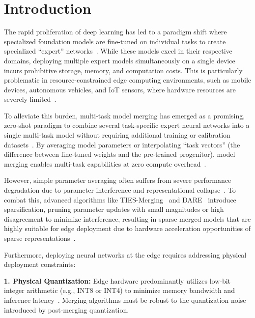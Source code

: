 \documentclass{article}
\theoremstyle{plain}
\theoremstyle{definition}
\theoremstyle{remark}
\begin{document}
\section{Introduction}
\label{sec:intro}

The rapid proliferation of deep learning has led to a paradigm shift where specialized foundation models are fine-tuned on individual tasks to create specialized ``expert'' networks~\cite{touvron23llama, devlin18bert}. While these models excel in their respective domains, deploying multiple expert models simultaneously on a single device incurs prohibitive storage, memory, and computation costs. This is particularly problematic in resource-constrained edge computing environments, such as mobile devices, autonomous vehicles, and IoT sensors, where hardware resources are severely limited~\cite{gholami21quantization}.

To alleviate this burden, multi-task model merging has emerged as a promising, zero-shot paradigm to combine several task-specific expert neural networks into a single multi-task model without requiring additional training or calibration datasets~\cite{fedavg, wortsman22wa, choshen23fusing}. By averaging model parameters or interpolating ``task vectors'' (the difference between fine-tuned weights and the pre-trained progenitor), model merging enables multi-task capabilities at zero compute overhead~\cite{ilharco22task}. 

However, simple parameter averaging often suffers from severe performance degradation due to parameter interference and representational collapse~\cite{ortiz23parameter}. To combat this, advanced algorithms like TIES-Merging~\cite{yadav23ties} and DARE~\cite{yu23dare} introduce sparsification, pruning parameter updates with small magnitudes or high disagreement to minimize interference, resulting in sparse merged models that are highly suitable for edge deployment due to hardware acceleration opportunities of sparse representations~\cite{han15compression, frankle18lottery}. 

Furthermore, deploying neural networks at the edge requires addressing physical deployment constraints:

\textbf{1. Physical Quantization:} Edge hardware predominantly utilizes low-bit integer arithmetic (e.g., INT8 or INT4) to minimize memory bandwidth and inference latency~\cite{nagel21whitepaper, jacob18quantization}. Merging algorithms must be robust to the quantization noise introduced by post-merging quantization.
\end{document}
